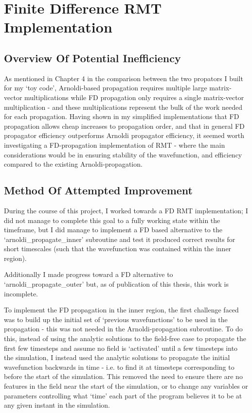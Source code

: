 \section{Finite Difference RMT Implementation}
\subsection{Overview Of Potential Inefficiency}
As mentioned in Chapter 4 in the comparison between the two propators I built for my `toy code', Arnoldi-based propagation requires multiple large matrix-vector multiplications while FD propagation only requires a single matrix-vector multiplication - and these multiplications represent the bulk of the work needed for each propagation. Having shown in my simplified implementations that FD propagation allows cheap increases to propagation order, and that in general FD propagator efficiency outperforms Arnoldi propagator efficiency, it seemed worth investigating a FD-propagation implementation of RMT - where the main considerations would be in ensuring stability of the wavefunction, and efficiency compared to the existing Arnoldi-propagation.

\subsection{Method Of Attempted Improvement}
During the course of this project, I worked towards a FD RMT implementation; I did not manage to complete this goal to a fully working state within the timeframe, but I did manage to implement a FD based alternative to the `arnoldi\_propagate\_inner' subroutine and test it produced correct results for short timescales (such that the wavefunction was contained within the inner region). 

Additionally I made progress toward a FD alternative to `arnoldi\_propagate\_outer' but, as of publication of this thesis, this work is incomplete.

To implement the FD propagation in the inner region, the first challenge faced was to build up the initial set of `previous wavefunctions' to be used in the propagation - this was not needed in the Arnoldi-propagation subroutine. To do this, instead of using the analytic solutions to the field-free case to propagate the first few timesteps and assume no field is `activated' until a few timesteps into the simulation, I instead used the analytic solutions to propagate the initial wavefunction backwards in time - i.e. to find it at timesteps corresponding to before the start of the simulation. This removed the need to ensure there are no features in the field near the start of the simulation, or to change any variables or parameters controlling what `time' each part of the program believes it to be at any given instant in the simulation.

